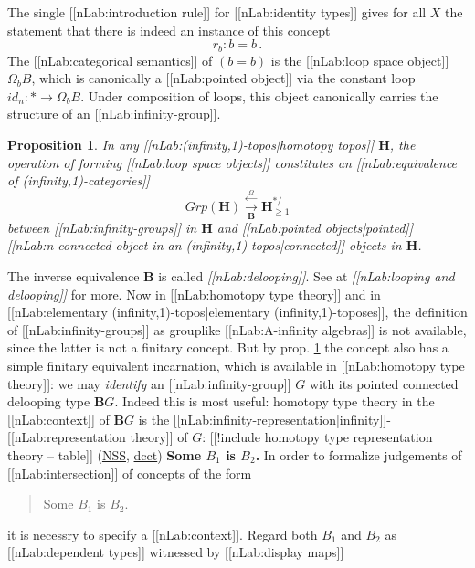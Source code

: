 \documentclass[12pt,titlepage]{article}
\theoremstyle{plain}
\newtheorem{prop}{Proposition}
\theoremstyle{definition}
\theoremstyle{remark}
\begin{document}
The single [[nLab:introduction rule]] for [[nLab:identity types]] gives for all $X$ the statement that there is indeed an instance of this concept
\begin{displaymath}
r_b \colon b = b
  \,.
\end{displaymath}
The [[nLab:categorical semantics]] of $(b = b)$ is the [[nLab:loop space object]] $\Omega_b B$, which is canonically a [[nLab:pointed object]] via the constant loop $id_n \colon \ast \to \Omega_b B$.
Under composition of loops, this object canonically carries the structure of an [[nLab:infinity-group]].
\begin{prop}
\label{LoopingDeloopingTheorem}\hypertarget{LoopingDeloopingTheorem}{}
In any [[nLab:(infinity,1)-topos|homotopy topos]] $\mathbf{H}$, the operation of forming [[nLab:loop space objects]] constitutes an [[nLab:equivalence of (infinity,1)-categories]]
\begin{displaymath}
Grp(\mathbf{H})
   \stackrel{\overset{\Omega}{\longleftarrow}}{\underset{\mathbf{B}}{\longrightarrow}}
  \mathbf{H}^{\ast/}_{\geq 1}
\end{displaymath}
between [[nLab:infinity-groups]] in $\mathbf{H}$ and [[nLab:pointed objects|pointed]] [[nLab:n-connected object in an (infinity,1)-topos|connected]] objects in $\mathbf{H}$.
\end{prop}
The inverse equivalence $\mathbf{B}$ is called \emph{[[nLab:delooping]]}. See at \emph{[[nLab:looping and delooping]]} for more.
Now in [[nLab:homotopy type theory]] and in [[nLab:elementary (infinity,1)-topos|elementary (infinity,1)-toposes]], the definition of [[nLab:infinity-groups]] as grouplike [[nLab:A-infinity algebras]] is not available, since the latter is not a finitary concept. But by prop. \ref{LoopingDeloopingTheorem} the concept also has a simple finitary equivalent incarnation, which is available in [[nLab:homotopy type theory]]: we may \emph{identify} an [[nLab:infinity-group]] $G$ with its pointed connected delooping type $\mathbf{B}G$.
Indeed this is most useful: homotopy type theory in the [[nLab:context]] of $\mathbf{B}G$ is the [[nLab:infinity-representation|infinity]]-[[nLab:representation theory]] of $G$:
[[!include homotopy type representation theory -- table]]
(\hyperlink{NSS}{NSS}, \hyperlink{dcct}{dcct})
\textbf{Some $B_1$ is $B_2$.}
In order to formalize judgements of [[nLab:intersection]] of concepts of the form
\begin{quote}%
Some $B_1$ is $B_2$.
\end{quote}
it is necessry to specify a [[nLab:context]]. Regard both $B_1$ and $B_2$ as [[nLab:dependent types]] witnessed by [[nLab:display maps]]
\end{document}
